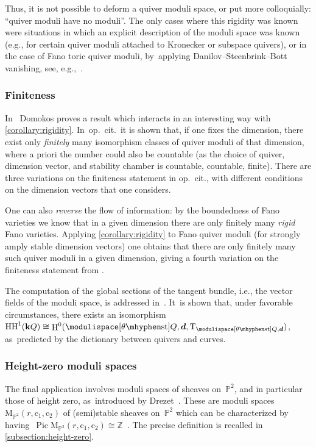 \documentclass[JEP,XML,SOM,Unicode,NoEqCountersInSection,published]{cedram}
\theoremstyle{plain}
\theoremstyle{definition}
\DeclareMathOperator\HH{H}
\DeclareMathOperator\hochschild{HH}
\DeclareMathOperator\Pic{Pic}
\newcommand\field{\mathbf{k}}
\newcommand\moduli{\ensuremath{\mathrm{M}}}
\newcommand\stable{\ensuremath{\mhyphen\mathrm{st}}}
\newcommand\tangent{\ensuremath{\mathrm{T}}}
\newcommand\tuple[1]{\ensuremath{{\boldsymbol{#1}}}}
\begin{document}
Thus, it is not possible to deform a quiver moduli space,
or put more colloquially: ``quiver moduli have no moduli''.
The only cases where this rigidity was known
were situations in which an explicit description of the moduli space was known
(e.g., for certain quiver moduli attached to Kronecker or subspace quivers),
or in the case of Fano toric quiver moduli, by~applying Danilov–Steenbrink–Bott vanishing,
see, e.g.,~\cite[Th.\,2.4(i)]{MR1916637}.

\subsubsection*{Finiteness}
In~\cite{2303.08522v2} Domokos proves a result which interacts
in an interesting way with \cref{corollary:rigidity}. In~op.~cit.~it is shown that,
if one fixes the dimension,
there exist only \emph{finitely} many isomorphism classes of quiver moduli of that dimension,
where a priori the number could also be countable
(as the choice of quiver, dimension vector, and stability chamber is
countable, \resp countable, \resp finite).
There are three variations on the finiteness statement in op.~cit.,
with different conditions on the dimension vectors that one considers.

One can also \emph{reverse} the flow of information:
by the boundedness of Fano varieties \cite[Th.\,0.2]{MR1189503}
we know that in a given dimension there are only finitely many \emph{rigid} Fano varieties.
Applying \cref{corollary:rigidity} to Fano quiver moduli (for strongly amply stable dimension vectors)
one obtains that there are only finitely many such quiver moduli in a given dimension,
giving a fourth variation on the finiteness statement from \cite{2303.08522v2}.

\smallskip

The computation of the global sections of the tangent bundle,
i.e., the vector fields of the moduli space,
is addressed in~\cite{MR4883104}. It~is shown that,
under favorable circumstances,
there exists an isomorphism~$\hochschild^1(\field Q)\cong\HH^0(\modulispace[\theta\stable]{Q,\tuple{d}},\tangent_{\modulispace[\theta\stable]{Q,\tuple{d}}})$, as~predicted by the dictionary between quivers and curves.

\subsubsection*{Height-zero moduli spaces}
The final application involves moduli spaces of sheaves on~$\mathbb{P}^2$,
and in particular those of height zero, as~introduced by Drezet~\cite{MR0916199,MR0944602,MR0915184}.
These are moduli spaces~$\moduli_{\mathbb{P}^2}(r,\mathrm{c}_1,\mathrm{c}_2)$
of (semi)stable sheaves on~$\mathbb{P}^2$
which can be characterized by having~$\Pic\moduli_{\mathbb{P}^2}(r,\mathrm{c}_1,\mathrm{c}_2)\cong\mathbb{Z}$~\cite[Th.\,2]{MR0915184}.
The precise definition is recalled in \cref{subsection:height-zero}.
\end{document}
